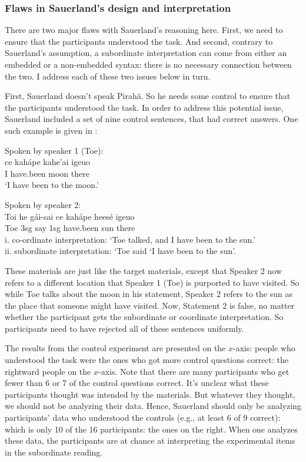 \documentclass{article}
\begin{document}
\subsubsection{Flaws in Sauerland's design and interpretation}

There are two major flaws with Sauerland’s reasoning here. First, we need to ensure that the participants understood the task. And second, contrary to Sauerland's assumption, a subordinate interpretation can come from either an embedded or a non-embedded syntax: there is no necessary connection between the two.  I address each of these two issues below in turn.

First, Sauerland doesn't speak Pirahã. So he needs some control to ensure that the participants understood the task. In order to address this potential issue, Sauerland included a set of nine control sentences, that had correct answers.  One such example is given in :

\eal
\label{sauerland_ex_cont}
\ex \label{sauerland_ex1_cont} Spoken by speaker 1 (Toe):\\
\gll
ce  kahápe kahe’ai igeuo \\ 
I   have.been moon there\\
\glt `I have been to the moon.'

\ex \label{sauerland_ex2_cont} Spoken by speaker 2:\\
\gll 
Toi he gái-sai ce kahápe heesé igeuo \\
Toe 3sg say 1sg have.been sun there\\
\glt i. co-ordinate interpretation: `Toe talked, and I have been to the sun.'\\
     ii. subordinate interpretation: `Toe said ‘I have been to the sun’.
\zl

These materials are just like the target materials, except that Speaker 2 now refers to a different location that Speaker 1 (Toe) is purported to have visited.  So while Toe talks about the moon in his statement, Speaker 2 refers to the sun as the place that someone might have visited.  Now, Statement 2 is false, no matter whether the participant gets the subordinate or coordinate interpretation.  So participants need to have rejected all of these sentences uniformly.

The results from the control experiment are presented on the $x$-axis:  people who understood the task were the ones who got more control questions correct: the rightward people on the $x$-axis.  Note that there are many participants who get fewer than 6 or 7 of the control questions correct.  It's unclear what these participants thought was intended by the materials.  But whatever they thought, we should not be analyzing their data. Hence, Sauerland should only be analyzing participants’ data who understood the controls (e.g., at least 6 of 9 correct):  which is only 10 of the 16 participants: the ones on the right. When one analyzes these data, the participants are at chance at interpreting the experimental items in the subordinate reading.
\end{document}
